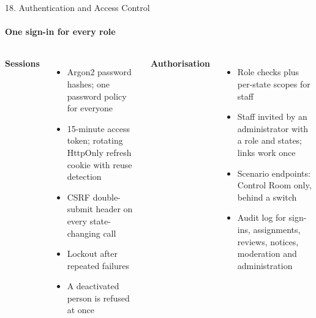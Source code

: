 \begin{frame}{18. Authentication and Access Control}
\framesubtitle{One sign-in for every role}
\scriptsize
\begin{columns}[T,onlytextwidth]
    \textbf{\textcolor{amritaMaroon}{Sessions}}
    \begin{itemize}\setlength\itemsep{2pt}
        \item Argon2 password hashes; one password policy for everyone
        \item 15-minute access token; rotating HttpOnly refresh cookie with reuse detection
        \item CSRF double-submit header on every state-changing call
        \item Lockout after repeated failures
        \item A deactivated person is refused at once
    \end{itemize}
    \textbf{\textcolor{amritaMaroon}{Authorisation}}
    \begin{itemize}\setlength\itemsep{2pt}
        \item Role checks plus per-state scopes for staff
        \item Staff invited by an administrator with a role and states; links work once
        \item Scenario endpoints: Control Room only, behind a switch
        \item Audit log for sign-ins, assignments, reviews, notices, moderation and administration
    \end{itemize}
\end{columns}
\end{frame}

